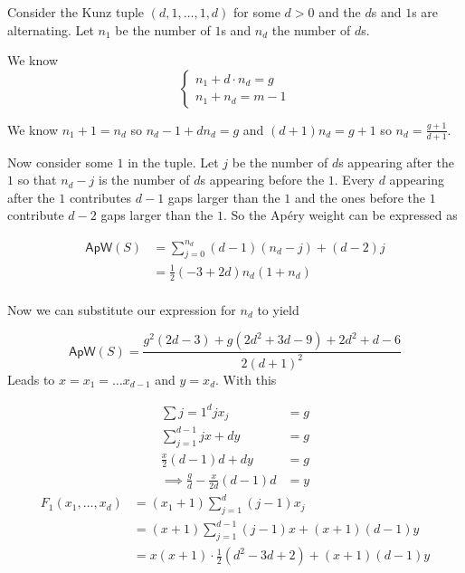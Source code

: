 \documentclass[11pt]{article}
\title{}
\author{Erik Imathiu-Jones}
\begin{document}
Consider the Kunz tuple \((d, 1, \dots, 1, d)\) for some \(d > 0\) and the \(d\)s and \(1\)s are alternating. Let \(n_1\) be the number of \(1\)s and \(n_d\) the number of \(d\)s.

We know \[\begin{cases} n_1 + d \cdot n_d = g \\ n_1 + n_d = m - 1\end{cases}\]

We know \(n_1 + 1 = n_d\) so \(n_d - 1 + d n_d = g\) and \((d + 1)n_d = g + 1\) so \(n_d = \frac{g+1}{d+1}\).

\iffalse
From the second equation we find \(n_1 = (m-1) - n_d\). Substituting this into the first equation yields \([(m-1) - n_d] + d \cdot n_d = g\) from which we conclude \[n_d = \frac{g - (m-1)}{d-1}.\]
\fi 

Now consider some \(1\) in the tuple. Let \(j\) be the number of \(d\)s appearing after the \(1\) so that \(n_d - j\) is the number of \(d\)s appearing before the \(1\). Every \(d\) appearing after the \(1\) contributes \(d-1\) gaps larger than the \(1\) and the ones before the \(1\) contribute \(d-2\) gaps larger than the \(1\). So the Ap\'ery weight can be expressed as 

\begin{align*}
    \mathsf{ApW}(S) &= \sum\limits_{j=0}^{n_d} (d-1)(n_d - j) + (d-2)j \\
    &= \frac{1}{2} (-3 + 2d) n_d (1 + n_d) \\
\end{align*}

Now we can substitute our expression for \(n_d\) to yield 

\iffalse\[\mathsf{ApW}(S) = \frac{(2d - 3)(d + g - m)(g - m + 1)}{2(d - 1)^2}\]

Maximize with respect to \(m\) yields \(\frac{(2d - 3)(g + 1)(d + g)}{2(d - 1)^2}
\)
\fi

\[\mathsf{ApW}(S) =  \frac{g^2(2d - 3) + g(2d^2 + 3d - 9) + 2d^2 + d - 6}{2(d+1)^2}\]
Leads to \(x = x_1 = \dots x_{d-1}\) and \(y = x_d\). With this

\begin{align*}
    \sum\limits{j=1}^d j x_j &= g \\
    \sum\limits_{j=1}^{d-1} j x  + d y &= g \\
    \frac{x}{2}(d-1)d + dy &= g\\
    \implies \frac{g}{d} - \frac{x}{2d}(d-1)d &= y  
\end{align*}
\begin{align*}
    F_1(x_1, \dots, x_{d}) &= (x_1 + 1)\sum\limits_{j=1}^{d} (j - 1) x_j \\
    &= (x + 1)\sum\limits_{j=1}^{d-1} (j - 1) x + (x + 1)(d - 1)y \\
    &= x(x+1) \cdot \frac{1}{2}(d^2 - 3d + 2) + (x+1)(d - 1)y
\end{align*}
\end{document}

